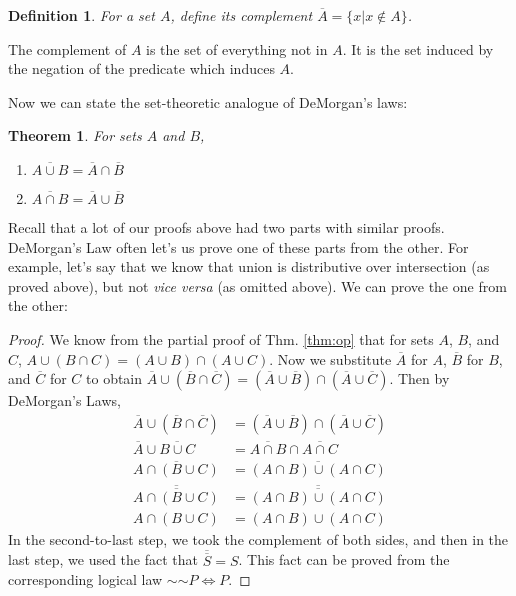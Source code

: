 \documentclass[12pt]{article}
\newcommand*{\oldneg}{\mathord{\sim}}
\newcounter{dfnc}
\newcounter{thmc}
\newtheorem{dfn}[dfnc]{Definition}
\newtheorem{thm}[thmc]{Theorem}
\begin{document}
\begin{dfn}
  For a set $A$, define its complement $\overline{A}=\{x|x\not\in A\}$.
\end{dfn}

The complement of $A$ is the set of everything not in $A$.  It is the
set induced by the negation of the predicate which induces $A$.

Now we can state the set-theoretic analogue of DeMorgan's laws:

\begin{thm}
  For sets $A$ and $B$,
  \begin{enumerate}[label=\alph*)]
  \item $\overline{A\cup B}=\overline{A}\cap\overline{B}$
  \item $\overline{A\cap B}=\overline{A}\cup\overline{B}$
  \end{enumerate}
\end{thm}

Recall that a lot of our proofs above had two parts with similar
proofs.  DeMorgan's Law often let's us prove one of these parts from
the other.  For example, let's say that we know that union is
distributive over intersection (as proved above), but not \textit{vice
  versa} (as omitted above).  We can prove the one from the other:

\begin{proof}
  We know from the partial proof of Thm. \ref{thm:op} that for sets
  $A$, $B$, and $C$, $A\cup(B\cap C)=(A\cup B)\cap(A\cup C)$.  Now we
  substitute $\overline{A}$ for $A$, $\overline{B}$ for $B$, and
  $\overline{C}$ for $C$ to obtain $\overline{A}\cup(\overline{B}\cap
  \overline{C})=(\overline{A}\cup \overline{B})\cap(\overline{A}\cup
  \overline{C})$.  Then by DeMorgan's Laws,
  \begin{align*}
    \overline{A}\cup(\overline{B}\cap \overline{C}) &=
    (\overline{A}\cup\overline{B})\cap(\overline{A}\cup\overline{C})
    \\
    \overline{A}\cup\overline{B\cup C}&=\overline{A\cap
      B}\cap\overline{A\cap C} \\
    \overline{A\cap(B\cup C)}&=\overline{(A\cap B)\cup(A\cap C)}\\
    \overline{\overline{A\cap(B\cup C)}}&=\overline{\overline{(A\cap B)\cup(A\cap C)}}\\
    A\cap(B\cup C)&=(A\cap B)\cup(A\cap C)
  \end{align*}
  In the second-to-last step, we took the complement of both sides,
  and then in the last step, we used the fact that
  $\overline{\overline{S}}=S$.  This fact can be proved from the
  corresponding logical law $\oldneg\oldneg P \Leftrightarrow P$.
\end{proof}
\end{document}
